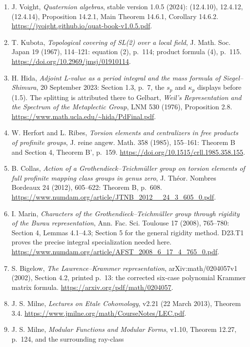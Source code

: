 \documentclass[11pt]{article}
\begin{document}
\begin{enumerate}
\item J. Voight, \emph{Quaternion algebras}, stable version
1.0.5 (2024): (12.4.10), 12.4.12, (12.4.14), Proposition
14.2.1, Main Theorem 14.6.1, Corollary 14.6.2.
\url{https://jvoight.github.io/quat-book-v1.0.5.pdf}.
\item T. Kubota, \emph{Topological covering of SL(2) over a
local field}, J. Math. Soc. Japan 19 (1967), 114--121:
equation (2), p.~114; product formula (4), p.~115.
\url{https://doi.org/10.2969/jmsj/01910114}.
\item H. Hida, \emph{Adjoint L-value as a period integral and
the mass formula of Siegel--Shimura}, 20 September 2023:
Section 1.3, p.~7, the $s_p$ and $\kappa_p$ displays before
(1.5).  The splitting is attributed there to Gelbart,
\emph{Weil's Representation and the Spectrum of the
Metaplectic Group}, LNM 530 (1976), Proposition 2.8.
\url{https://www.math.ucla.edu/~hida/PdFinal.pdf}.
\item W. Herfort and L. Ribes, \emph{Torsion elements and
centralizers in free products of profinite groups}, J. reine
angew. Math. 358 (1985), 155--161: Theorem B and Section 4,
Theorem B', p.~159. \url{https://doi.org/10.1515/crll.1985.358.155}.
\item B. Collas, \emph{Action of a Grothendieck--Teichm\"uller
group on torsion elements of full profinite mapping class groups
in genus zero}, J. Th\'eor. Nombres Bordeaux 24 (2012),
605--622: Theorem B, p.~608.
\url{https://www.numdam.org/article/JTNB_2012__24_3_605_0.pdf}.
\item I. Marin, \emph{Characters of the Grothendieck--Teichm\"uller
group through rigidity of the Burau representation}, Ann. Fac.
Sci. Toulouse 17 (2008), 765--780: Section 4, Lemmas 4.1--4.3;
Section 5 for the general rigidity method.  D23.T1 proves the
precise integral specialization needed here.
\url{https://www.numdam.org/article/AFST_2008_6_17_4_765_0.pdf}.
\item S. Bigelow, \emph{The Lawrence--Krammer representation},
arXiv:math/0204057v1 (2002), Section 4.2, printed p.~13:
the corrected six-case polynomial Krammer matrix formula.
\url{https://arxiv.org/pdf/math/0204057}.
\item J. S. Milne, \emph{Lectures on Etale Cohomology}, v2.21
(22 March 2013), Theorem 3.4.
\url{https://www.jmilne.org/math/CourseNotes/LEC.pdf}.
\item J. S. Milne, \emph{Modular Functions and Modular Forms},
v1.10, Theorem 12.27, p.~124, and the surrounding ray-class

\end{enumerate}
\end{document}
